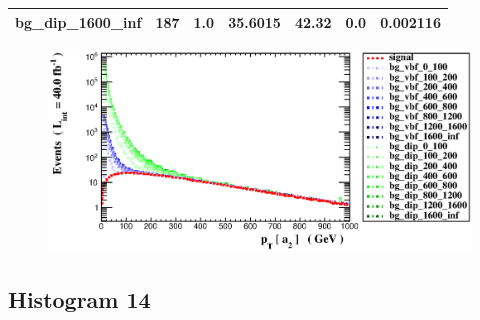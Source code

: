 \documentclass[a4paper, 10pt]{article}
\begin{document}
\begin{table}[H]
\begin{center}
\begin{tabular}{|m{23.0mm}|m{23.0mm}|m{18.0mm}|m{19.0mm}|m{19.0mm}|m{19.0mm}|m{19.0mm}|}
      \hline
      {\cellcolor{white}         bg\_dip\_1600\_inf}& {\cellcolor{white}         187}& {\cellcolor{white}         1.0}& {\cellcolor{white}         35.6015}& {\cellcolor{white}         42.32}& {\cellcolor{green}         0.0}& {\cellcolor{green}         0.002116}\\
\hline
    \end{tabular}
  \end{center}
\end{table}

\begin{figure}[H]
  \begin{center}
    \includegraphics[scale=0.45]{selection_12.eps}\\
\caption{   }
  \end{center}
\end{figure}
      \newpage
\subsection{ Histogram 14}
\end{document}
